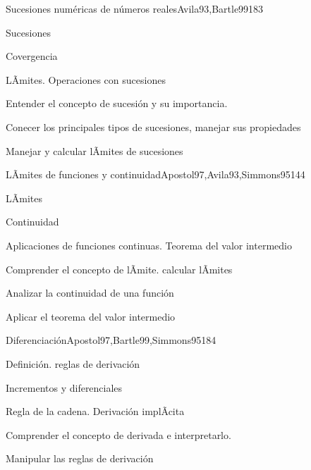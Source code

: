 \begin{syllabus}
\begin{unit}{Sucesiones numéricas de números reales}{Avila93,Bartle99}{18}{3}
   \begin{topics}
      \item Sucesiones
      \item Covergencia
      \item LÃ­mites. Operaciones con sucesiones
   \end{topics}

   \begin{learningoutcomes}
      \item Entender el concepto de sucesión y su importancia.
      \item Conecer los principales tipos de sucesiones, manejar sus propiedades
      \item Manejar y calcular lÃ­mites de sucesiones
      \end{learningoutcomes}
\end{unit}

\begin{unit}{LÃ­mites de funciones y continuidad}{Apostol97,Avila93,Simmons95}{14}{4}
   \begin{topics}
      \item LÃ­mites
      \item Continuidad
      \item Aplicaciones de funciones continuas. Teorema del valor intermedio
   \end{topics}

   \begin{learningoutcomes}
      \item Comprender el concepto de lÃ­mite. calcular lÃ­mites
      \item Analizar la continuidad de una función
      \item Aplicar el teorema del valor intermedio
      \end{learningoutcomes}
\end{unit}

\begin{unit}{Diferenciación}{Apostol97,Bartle99,Simmons95}{18}{4}
   \begin{topics}
      \item Definición. reglas de derivación
      \item Incrementos y diferenciales
      \item Regla de la cadena. Derivación implÃ­cita
   \end{topics}

   \begin{learningoutcomes}
      \item Comprender el concepto de derivada e interpretarlo.
      \item Manipular las reglas de derivación
      \end{learningoutcomes}
\end{unit}


\end{syllabus}
